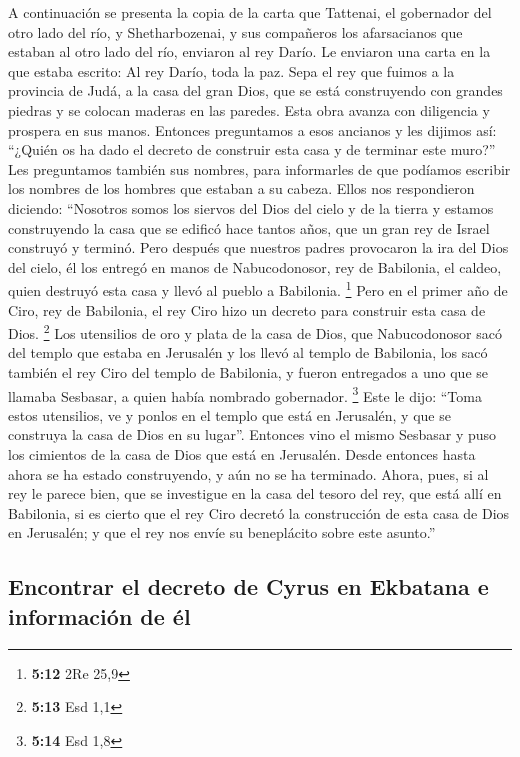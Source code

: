  A continuación se presenta la copia de la carta que
Tattenai, el gobernador del otro lado del río, y Shetharbozenai, y sus
compañeros los afarsacianos que estaban al otro lado del río, enviaron
al rey Darío.  Le enviaron una carta en la que estaba
escrito: Al rey Darío, toda la paz.  Sepa el rey que
fuimos a la provincia de Judá, a la casa del gran Dios, que se está
construyendo con grandes piedras y se colocan maderas en las paredes.
Esta obra avanza con diligencia y prospera en sus manos. 
Entonces preguntamos a esos ancianos y les dijimos así: ``¿Quién os ha
dado el decreto de construir esta casa y de terminar este muro?''
 Les preguntamos también sus nombres, para informarles de
que podíamos escribir los nombres de los hombres que estaban a su
cabeza.  Ellos nos respondieron diciendo: ``Nosotros
somos los siervos del Dios del cielo y de la tierra y estamos
construyendo la casa que se edificó hace tantos años, que un gran rey de
Israel construyó y terminó.  Pero después que nuestros
padres provocaron la ira del Dios del cielo, él los entregó en manos de
Nabucodonosor, rey de Babilonia, el caldeo, quien destruyó esta casa y
llevó al pueblo a Babilonia. \footnote{\textbf{5:12} 2Re 25,9}
 Pero en el primer año de Ciro, rey de Babilonia, el rey
Ciro hizo un decreto para construir esta casa de Dios. \footnote{\textbf{5:13}
  Esd 1,1}  Los utensilios de oro y plata de la casa de
Dios, que Nabucodonosor sacó del templo que estaba en Jerusalén y los
llevó al templo de Babilonia, los sacó también el rey Ciro del templo de
Babilonia, y fueron entregados a uno que se llamaba Sesbasar, a quien
había nombrado gobernador. \footnote{\textbf{5:14} Esd 1,8}
 Este le dijo: ``Toma estos utensilios, ve y ponlos en el
templo que está en Jerusalén, y que se construya la casa de Dios en su
lugar''.  Entonces vino el mismo Sesbasar y puso los
cimientos de la casa de Dios que está en Jerusalén. Desde entonces hasta
ahora se ha estado construyendo, y aún no se ha terminado.
 Ahora, pues, si al rey le parece bien, que se investigue
en la casa del tesoro del rey, que está allí en Babilonia, si es cierto
que el rey Ciro decretó la construcción de esta casa de Dios en
Jerusalén; y que el rey nos envíe su beneplácito sobre este asunto.''

\hypertarget{encontrar-el-decreto-de-cyrus-en-ekbatana-e-informaciuxf3n-de-uxe9l}{%
\subsection{Encontrar el decreto de Cyrus en Ekbatana e información de
él}\label{encontrar-el-decreto-de-cyrus-en-ekbatana-e-informaciuxf3n-de-uxe9l}}

